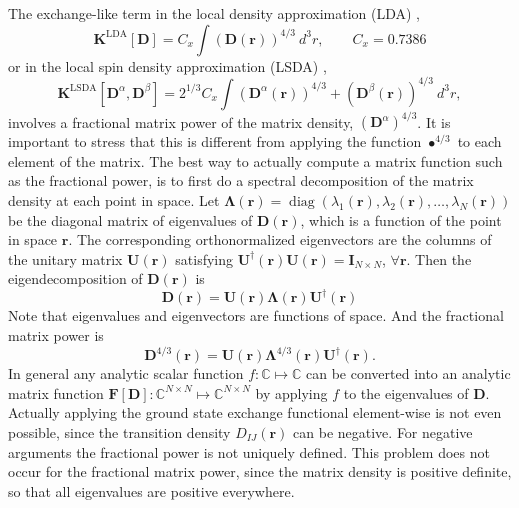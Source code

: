 \documentclass[journal=jpclcd,manuscript=letter]{achemso}
\DeclareMathOperator{\Diag}{diag}
\newcommand\m[1]{\mathbf{#1}}
\renewcommand\vec[1]{\mathbf{#1}}
\begin{document}
The exchange-like term in the local density approximation (LDA) \cite[6.1.20]{ParrYangBook} \cite{Dirac1930},
\begin{equation}
  \m{K}^{\text{LDA}}[\m{D}] = C_x \int (\m{D}(\vec{r}))^{4/3} ~ d^3r, \quad \quad C_x = 0.7386 \label{eqn:exchange_term_lda}
\end{equation}
or in the local spin density approximation (LSDA) \cite[8.2.16]{ParrYangBook},
\begin{equation}
  \m{K}^{\text{LSDA}}[\m{D}^{\alpha},\m{D}^{\beta}] = 2^{1/3} C_x \int (\m{D}^{\alpha}(\vec{r}))^{4/3} + (\m{D}^{\beta}(\vec{r}))^{4/3} ~ d^3r, \label{eqn:exchange_term_lsda}
  \end{equation}
involves a fractional matrix power of the matrix density, $(\m{D}^{\alpha})^{4/3}$.
It is important to stress that this is different from applying the function $\bullet^{4/3}$ to
each element of the matrix. The best way to actually compute a matrix function such as the fractional power,
is to first do a spectral decomposition of the matrix density at each point in space. Let
$\m{\Lambda}(\vec{r}) = \Diag\left(\lambda_1(\vec{r}),\lambda_2(\vec{r}),\ldots,\lambda_N(\vec{r}) \right)$ be the diagonal
matrix of eigenvalues of $\m{D}(\vec{r})$, which is a function of the point in space $\vec{r}$. The corresponding orthonormalized
eigenvectors are the columns of the unitary matrix $\m{U}(\vec{r})$ satisfying $\m{U}^{\dagger}(\vec{r}) \m{U}(\vec{r}) = \m{I}_{N \times N}$, $\forall \vec{r}$.
Then the eigendecomposition of $\m{D}(\vec{r})$ is
\begin{equation}
 \m{D}(\vec{r}) = \m{U}(\vec{r}) \m{\Lambda}(\vec{r}) \m{U}^{\dagger}(\vec{r})
\end{equation}
Note that eigenvalues and eigenvectors are functions of space. And the fractional matrix power is 
\begin{equation}
  \m{D}^{4/3}(\vec{r}) = \m{U}(\vec{r}) \m{\Lambda}^{4/3}(\vec{r}) \m{U}^{\dagger}(\vec{r}).
\end{equation}
In general any analytic scalar function $f : \mathbb{C} \mapsto \mathbb{C}$ can be converted into an analytic
matrix function $\m{F}[\m{D}]: \mathbb{C}^{N \times N} \mapsto \mathbb{C}^{N \times N}$ by applying $f$ to
the eigenvalues of $\m{D}$. 
Actually applying the ground state exchange functional element-wise is not even possible, since the transition density $D_{IJ}(\vec{r})$
can be negative. For negative arguments the fractional power is not uniquely defined. This problem does not occur for the fractional matrix
power, since the matrix density is positive definite, so that all eigenvalues are positive everywhere.
\end{document}
